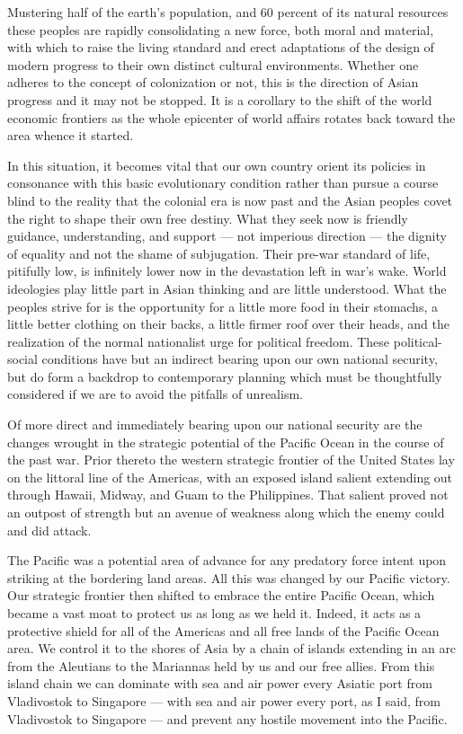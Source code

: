 \documentclass[a4paper]{amsbook}
\begin{document}
Mustering half of the earth's population, and 60 percent of its natural resources these peoples are rapidly consolidating a new force, both moral and material, with which to raise the living standard and erect adaptations of the design of modern progress to their own distinct cultural environments. Whether one adheres to the concept of colonization or not, this is the direction of Asian progress and it may not be stopped. It is a corollary to the shift of the world economic frontiers as the whole epicenter of world affairs rotates back toward the area whence it started.

In this situation, it becomes vital that our own country orient its policies in consonance with this basic evolutionary condition rather than pursue a course blind to the reality that the colonial era is now past and the Asian peoples covet the right to shape their own free destiny. What they seek now is friendly guidance, understanding, and support — not imperious direction — the dignity of equality and not the shame of subjugation. Their pre-war standard of life, pitifully low, is infinitely lower now in the devastation left in war's wake. World ideologies play little part in Asian thinking and are little understood. What the peoples strive for is the opportunity for a little more food in their stomachs, a little better clothing on their backs, a little firmer roof over their heads, and the realization of the normal nationalist urge for political freedom. These political-social conditions have but an indirect bearing upon our own national security, but do form a backdrop to contemporary planning which must be thoughtfully considered if we are to avoid the pitfalls of unrealism.

Of more direct and immediately bearing upon our national security are the changes wrought in the strategic potential of the Pacific Ocean in the course of the past war. Prior thereto the western strategic frontier of the United States lay on the littoral line of the Americas, with an exposed island salient extending out through Hawaii, Midway, and Guam to the Philippines. That salient proved not an outpost of strength but an avenue of weakness along which the enemy could and did attack.

The Pacific was a potential area of advance for any predatory force intent upon striking at the bordering land areas. All this was changed by our Pacific victory. Our strategic frontier then shifted to embrace the entire Pacific Ocean, which became a vast moat to protect us as long as we held it. Indeed, it acts as a protective shield for all of the Americas and all free lands of the Pacific Ocean area. We control it to the shores of Asia by a chain of islands extending in an arc from the Aleutians to the Mariannas held by us and our free allies. From this island chain we can dominate with sea and air power every Asiatic port from Vladivostok to Singapore — with sea and air power every port, as I said, from Vladivostok to Singapore — and prevent any hostile movement into the Pacific.
\end{document}
